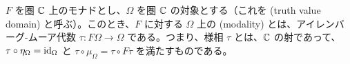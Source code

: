 \documentclass[
		head_space=20mm,
		foot_space=20mm,
		gutter=10mm,
		line_length=190mm
]{jlreq}
\begin{document}
\begin{definition}[様相] \label{def:modality}
	$F$ を圏 $\mathbb{C}$ 上のモナドとし、$\Omega$ を圏 $\mathbb{C}$ の対象とする（これを (truth value domain) と呼ぶ）。このとき、$F$ に対する $\Omega$ 上の (modality) とは、アイレンバーグ-ムーア代数 $\tau\colon F\Omega\to\Omega$ である。つまり、様相 $\tau$ とは、$\mathbb{C}$ の射であって、$\tau\circ\eta_{\Omega}=\mathrm{id}_{\Omega}$ と $\tau\circ\mu_{\Omega}=\tau\circ F\tau$ を満たすものである。\vspace{5pt}

	\begin{center}
		\qquad
	\end{center}
\end{definition}
\end{document}
